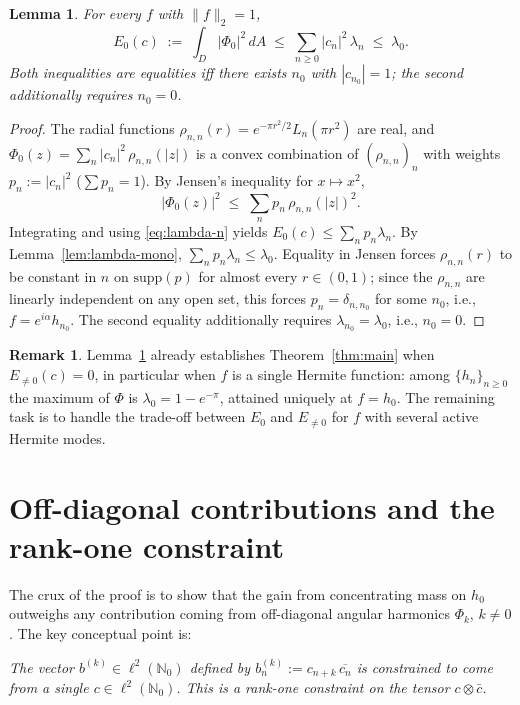\documentclass[11pt]{article}
\newtheorem{lemma}[theorem]{Lemma}
\theoremstyle{definition}
\newtheorem{remark}[theorem]{Remark}
\newcommand{\N}{\mathbb{N}}
\newcommand{\norm}[1]{\lVert#1\rVert}
\begin{document}
\begin{lemma}\label{lem:k0}
For every $f$ with $\norm{f}_{2}=1$,
\[
   E_{0}(c)\;:=\;\int_{D}|\Phi_{0}|^{2}\,dA
   \;\le\; \sum_{n\ge 0}|c_{n}|^{2}\,\lambda_{n}\;\le\;\lambda_{0}.
\]
Both inequalities are equalities iff there exists $n_{0}$ with
$|c_{n_{0}}|=1$; the second additionally requires $n_{0}=0$.
\end{lemma}

\begin{proof}
The radial functions $\rho_{n,n}(r)=e^{-\pi r^{2}/2}L_{n}(\pi r^{2})$ are
real, and $\Phi_{0}(z)=\sum_{n}|c_{n}|^{2}\,\rho_{n,n}(|z|)$ is a convex
combination of $(\rho_{n,n})_{n}$ with weights $p_{n}:=|c_{n}|^{2}$
($\sum p_{n}=1$).  By Jensen's inequality for $x\mapsto x^{2}$,
\[
  |\Phi_{0}(z)|^{2}\;\le\;\sum_{n}p_{n}\,\rho_{n,n}(|z|)^{2}.
\]
Integrating and using \eqref{eq:lambda-n} yields
$E_{0}(c)\le\sum_{n}p_{n}\lambda_{n}$.  By Lemma~\ref{lem:lambda-mono},
$\sum_{n}p_{n}\lambda_{n}\le\lambda_{0}$.  Equality in Jensen forces
$\rho_{n,n}(r)$ to be constant in $n$ on $\mathrm{supp}(p)$ for almost every
$r\in(0,1)$; since the $\rho_{n,n}$ are linearly independent on any open set,
this forces $p_{n}=\delta_{n,n_{0}}$ for some $n_{0}$, i.e., $f=e^{i\alpha}
h_{n_{0}}$.  The second equality additionally requires
$\lambda_{n_{0}}=\lambda_{0}$, i.e., $n_{0}=0$.
\end{proof}

\begin{remark}
Lemma~\ref{lem:k0} already establishes Theorem~\ref{thm:main} when
$E_{\ne 0}(c)=0$, in particular when $f$ is a single Hermite function: among
$\{h_{n}\}_{n\ge 0}$ the maximum of $\Phi$ is $\lambda_{0}=1-e^{-\pi}$,
attained uniquely at $f=h_{0}$.  The remaining task is to handle the
trade-off between $E_{0}$ and $E_{\ne 0}$ for $f$ with several active
Hermite modes.
\end{remark}

\section{Off-diagonal contributions and the rank-one constraint}\label{sec:k-nonzero}

The crux of the proof is to show that the gain from concentrating mass on
$h_{0}$ outweighs any contribution coming from off-diagonal angular
harmonics $\Phi_{k}$, $k\ne 0$.  The key conceptual point is:

\smallskip\noindent\textit{The vector $b^{(k)}\in\ell^{2}(\N_{0})$ defined by
$b^{(k)}_{n}:=c_{n+k}\,\overline{c_{n}}$ is constrained to come from a
single $c\in\ell^{2}(\N_{0})$.  This is a rank-one constraint on the
tensor $c\otimes\bar c$.}
\end{document}
